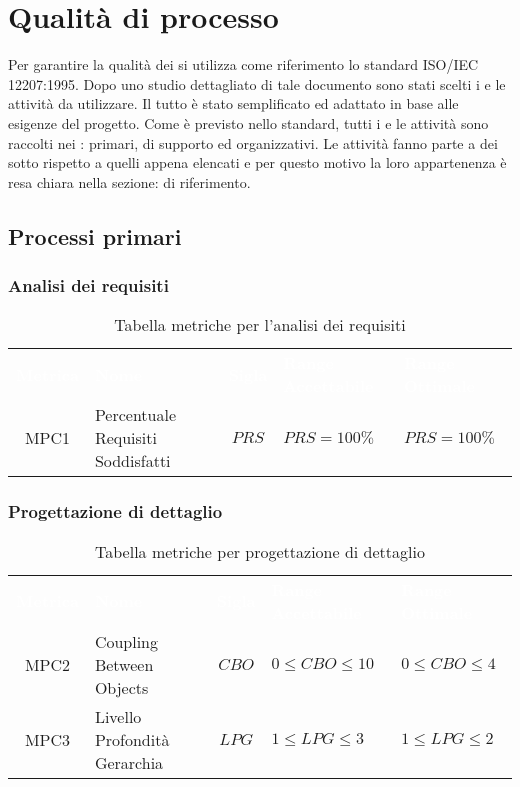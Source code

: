 \section{Qualità di processo}
Per garantire la qualità dei  si utilizza come riferimento lo standard ISO/IEC 12207:1995. Dopo uno studio dettagliato di tale documento sono stati scelti i 
e le attività da utilizzare. Il tutto è stato semplificato ed adattato in base alle esigenze del progetto. Come è previsto nello standard, tutti i  e le attività sono raccolti
nei : primari, di supporto ed organizzativi. Le attività fanno parte a dei sotto  rispetto a quelli appena elencati e per questo motivo la loro
appartenenza è resa chiara nella sezione:  di riferimento.

\subsection{Processi primari}

\subsubsection{Analisi dei requisiti}
   \renewcommand{\arraystretch}{1.5}
   \begin{longtable}{ c C{4cm} c C{3.5cm} C{3.5cm}}
   	\caption{Tabella metriche per l'analisi dei requisiti}\\
   	\textcolor{white}{\textbf{Metrica}} & \textcolor{white}{\textbf{Nome}} & \textcolor{white}{\textbf{Sigla}} & \textcolor{white}{\textbf{Range Accettabile}} & \textcolor{white}{\textbf{Range Ottimale}}\\
   	MPC1 & Percentuale Requisiti Soddisfatti & $PRS$ & $PRS = 100\%$ & $PRS = 100\%$ \\
   \end{longtable}
\vspace{0.3cm}
\subsubsection{Progettazione di dettaglio}
\renewcommand{\arraystretch}{1.5}
\begin{longtable}{ c C{4cm} c C{3.5cm} C{3.5cm}}
	\caption{Tabella metriche per progettazione di dettaglio}\\
	\textcolor{white}{\textbf{Metrica}} & \textcolor{white}{\textbf{Nome}} & \textcolor{white}{\textbf{Sigla}} & \textcolor{white}{\textbf{Range Accettabile}} & \textcolor{white}{\textbf{Range Ottimale}}\\
    MPC2 & Coupling Between Objects & $CBO$ & $0 \leq CBO \leq 10$ & $0 \leq CBO \leq 4$ \\
    MPC3 & Livello Profondità Gerarchia & $LPG$ &  $1 \leq LPG \leq 3$ &  $1 \leq LPG \leq 2$ \\
\end{longtable}

